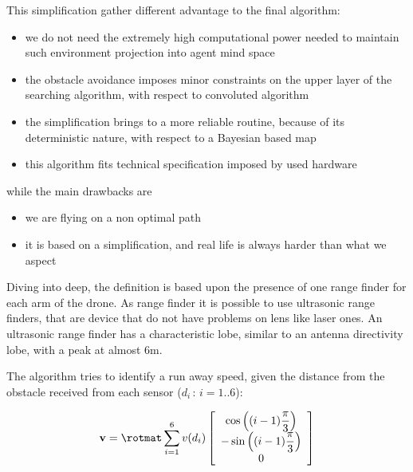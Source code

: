 This simplification gather different advantage to the final algorithm:
\begin{itemize}
\item we do not need the extremely high computational power needed to maintain such environment projection into agent mind space
\item the obstacle avoidance imposes minor constraints on the upper layer of the searching algorithm, with respect to convoluted algorithm
\item the simplification brings to a more reliable routine, because of its deterministic nature, with respect to a Bayesian based map
\item this algorithm fits technical specification imposed by used hardware
\end{itemize}
while the main drawbacks are
\begin{itemize}
\item we are flying on a non optimal path
\item it is based on a simplification, and real life is always harder than what we aspect
\end{itemize}

Diving into deep, the definition is based upon the presence of one range finder for each arm of the drone. As range finder it is possible to use ultrasonic range finders, that are device that do not have problems on lens like laser ones. An ultrasonic range finder has a characteristic lobe, similar to an antenna directivity lobe, with a peak at almost \num{6}\si{\meter}. 

The algorithm tries to identify a run away speed, given the distance from the obstacle received from each sensor (${d_i\,:\,i=1..6}$):

\begin{equation}
\mathbf{v} = \rotmat \sum\limits_{i=1}^{6}v(d_i)\vettore{\cos\braces{(i-1)\dfrac{\pi}{3}} \\ -\sin\braces{(i-1)\dfrac{\pi}{3}} \\0}
\end{equation}


